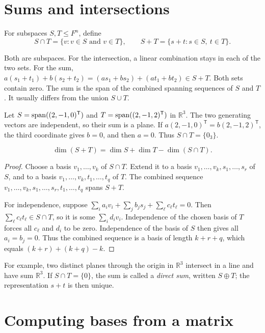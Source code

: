 \section{Sums and intersections}

\begin{definition}
For subspaces $S,T\leq F^n$, define
\[
 S\cap T=\{v:v\in S\text{ and }v\in T\},\qquad
 S+T=\{s+t:s\in S,\ t\in T\}.
\]
\end{definition}

Both are subspaces. For the intersection, a linear combination stays in
each of the two sets. For the sum,
$a(s_1+t_1)+b(s_2+t_2)=(as_1+bs_2)+(at_1+bt_2)\in S+T$.
Both sets contain zero.
The sum is the span of the combined spanning sequences of $S$ and $T$.
It usually differs from the union $S\cup T$.

\begin{example}
Let $S=\operatorname{span}((2,-1,0)^{\mathsf T})$ and
$T=\operatorname{span}((2,-1,2)^{\mathsf T})$ in $\mathbb R^3$.
The two generating vectors are independent, so their sum is a plane.
If $a(2,-1,0)^{\mathsf T}=b(2,-1,2)^{\mathsf T}$, the third coordinate
gives $b=0$, and then $a=0$. Thus $S\cap T=\{0_3\}$.
\end{example}

\begin{theorem}
\[
 \boxed{\dim(S+T)=\dim S+\dim T-\dim(S\cap T).}
\]
\end{theorem}
\begin{proof}
Choose a basis $v_1,\ldots,v_k$ of $S\cap T$.
Extend it to a basis $v_1,\ldots,v_k,s_1,\ldots,s_r$ of $S$, and
to a basis $v_1,\ldots,v_k,t_1,\ldots,t_q$ of $T$.
The combined sequence $v_1,\ldots,v_k,s_1,\ldots,s_r,t_1,\ldots,t_q$
spans $S+T$.

For independence, suppose
$\sum_i a_iv_i+\sum_j b_js_j+\sum_\ell c_\ell t_\ell=0$.
Then $\sum_\ell c_\ell t_\ell\in S\cap T$, so it is some
$\sum_i d_iv_i$. Independence of the chosen basis of $T$ forces
all $c_\ell$ and $d_i$ to be zero.
Independence of the basis of $S$ then gives all $a_i=b_j=0$.
Thus the combined sequence is a basis of length $k+r+q$, which equals
$(k+r)+(k+q)-k$.
\end{proof}

For example, two distinct planes through the origin in $\mathbb R^3$
intersect in a line and have sum $\mathbb R^3$.
If $S\cap T=\{0\}$, the sum is called a \emph{direct sum}, written
$S\oplus T$; the representation $s+t$ is then unique.

\section{Computing bases from a matrix}


